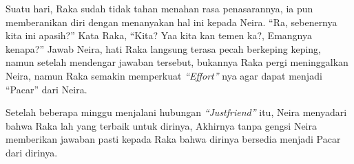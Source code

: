 Suatu hari, Raka sudah tidak tahan menahan rasa penasarannya, ia pun memberanikan diri dengan menanyakan hal ini kepada Neira. ``Ra, sebenernya kita ini apasih?'' Kata Raka, ``Kita? Yaa kita kan temen ka?, Emangnya kenapa?'' Jawab Neira, hati Raka langsung terasa pecah berkeping keping, namun setelah mendengar jawaban tersebut, bukannya Raka pergi meninggalkan Neira, namun Raka semakin memperkuat \textit{``Effort''} nya agar dapat menjadi ``Pacar'' dari Neira.


Setelah beberapa minggu menjalani hubungan \textit{``Justfriend''} itu, Neira menyadari bahwa Raka lah yang terbaik untuk dirinya, Akhirnya tanpa gengsi Neira memberikan jawaban pasti kepada Raka bahwa dirinya bersedia menjadi Pacar dari dirinya.

\jedahias
